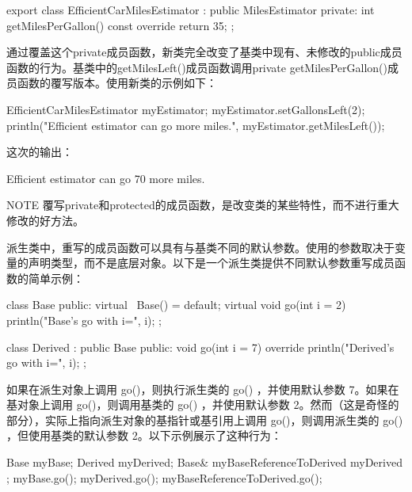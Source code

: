 \begin{cpp}
export class EfficientCarMilesEstimator : public MilesEstimator
{
    private:
        int getMilesPerGallon() const override { return 35; }
};
\end{cpp}

通过覆盖这个private成员函数，新类完全改变了基类中现有、未修改的public成员函数的行为。基类中的getMilesLeft()成员函数调用private getMilesPerGallon()成员函数的覆写版本。使用新类的示例如下：

\begin{cpp}
EfficientCarMilesEstimator myEstimator;
myEstimator.setGallonsLeft(2);
println("Efficient estimator can go {} more miles.",
        myEstimator.getMilesLeft());
\end{cpp}

这次的输出：

\begin{shell}
Efficient estimator can go 70 more miles.
\end{shell}

\begin{myNotic}{NOTE}
覆写private和protected的成员函数，是改变类的某些特性，而不进行重大修改的好方法。
\end{myNotic}


派生类中，重写的成员函数可以具有与基类不同的默认参数。使用的参数取决于变量的声明类型，而不是底层对象。以下是一个派生类提供不同默认参数重写成员函数的简单示例：

\begin{cpp}
class Base
{
    public:
        virtual ~Base() = default;
        virtual void go(int i = 2) { println("Base's go with i={}", i); }
};

class Derived : public Base
{
    public:
        void go(int i = 7) override { println("Derived's go with i={}", i); }
};
\end{cpp}

如果在派生对象上调用 go()，则执行派生类的 go() ，并使用默认参数 7。如果在基对象上调用 go()，则调用基类的 go() ，并使用默认参数 2。然而（这是奇怪的部分），实际上指向派生对象的基指针或基引用上调用 go()，则调用派生类的 go() ，但使用基类的默认参数 2。以下示例展示了这种行为：

\begin{cpp}
Base myBase;
Derived myDerived;
Base& myBaseReferenceToDerived { myDerived };
myBase.go();
myDerived.go();
myBaseReferenceToDerived.go();
\end{cpp}

